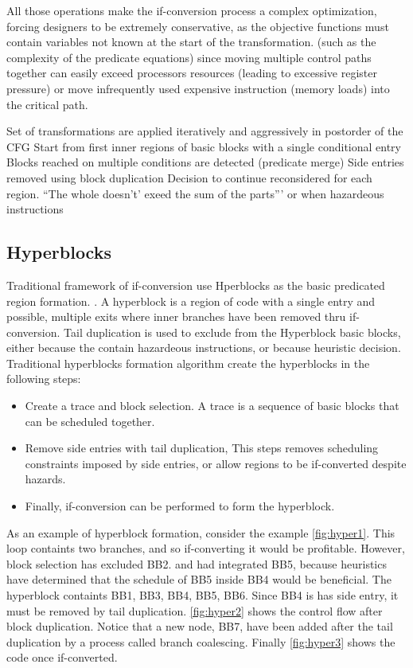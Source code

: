 \begin{figure}
{    \label{fig:wc2}}
\label{fig:wc example}
\end{figure}

All those operations make the if-conversion process a complex optimization, forcing designers to be extremely conservative, as the objective functions must contain variables not known at the start of the transformation. (such as the complexity of the predicate equations) since moving multiple control paths together can easily exceed processors resources (leading to excessive register pressure) or move infrequently used expensive instruction (memory loads) into the critical path. 

Set of transformations are applied iteratively and aggressively in postorder of the CFG
Start from first inner regions of basic blocks with a single conditional entry
Blocks reached on multiple conditions are detected (predicate merge)
Side entries removed using block duplication 
Decision to continue reconsidered for each region. ``The whole doesn't' exeed the sum of the parts''' or when hazardeous instructions

\subsection{Hyperblocks}

Traditional framework of if-conversion use Hperblocks as the basic predicated region formation. \cite{Mahlke:1992:ECS:144965.144998}. A hyperblock is a region of code with a single entry and possible, multiple exits where inner branches have been removed thru if-conversion. Tail duplication is used to exclude from the Hyperblock basic blocks, either because the contain hazardeous instructions, or because heuristic decision. 
Traditional hyperblocks formation algorithm create the hyperblocks in the following steps:
\begin{itemize}
\item Create a trace and block selection. A trace is a sequence of basic blocks that can be scheduled together. 
\item Remove side entries with tail duplication, This steps removes scheduling constraints imposed by side entries, or allow regions to be if-converted despite hazards.
\item Finally, if-conversion can be performed to form the hyperblock. 
\end{itemize}

As an example of hyperblock formation, consider the example \ref{fig:hyper1}. This loop containts two branches, and so if-converting it would be profitable. However, block selection has excluded BB2. and had integrated BB5, because heuristics have determined that the schedule of BB5 inside BB4 would be beneficial. The hyperblock containts {BB1, BB3, BB4, BB5, BB6}. Since BB4 is has side entry, it must be removed by tail duplication. \ref{fig:hyper2} shows the  control flow after block duplication. Notice that a new node, BB7, have been added after the tail duplication by a process called branch coalescing. Finally \ref{fig:hyper3} shows the code once if-converted.

